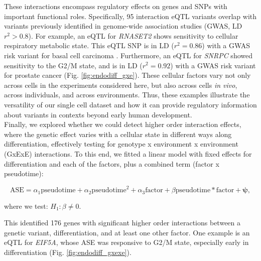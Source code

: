 These interactions encompass regulatory effects on genes and SNPs with important functional roles. Specifically, 95 interaction eQTL variants overlap with variants previously identified in genome-wide association studies (GWAS, LD $r^2>0.8$). 
For example, an eQTL for \textit{RNASET2} shows sensitivity to cellular respiratory metabolic state. 
This eQTL SNP is in LD ($r^2=0.86$) with a GWAS risk variant for basal cell carcinoma \cite{chahal2016genome}. Furthermore, an eQTL for \textit{SNRPC} showed sensitivity to the G2/M state, and is in LD ($r^2=0.92$) with a GWAS risk variant for prostate cancer \cite{schumacher2018association} (Fig. \ref{fig:endodiff_gxe}). 
These cellular factors vary not only across cells in the experiments considered here, but also across cells \textit{in vivo}, across individuals, and across environments. 
Thus, these examples illustrate the versatility of our single cell dataset and how it can provide regulatory information about variants in contexts beyond early human development.\\

Finally, we explored whether we could detect higher order interaction effects, where the genetic effect varies with a cellular state in different ways along differentiation, effectively testing for genotype x environment x environment (GxExE) interactions. 
To this end, we fitted a linear model with fixed effects for differentiation and each of the factors, plus a combined term (factor x pseudotime):

\begin{equation}
    \mathrm{ASE} = \alpha_1 \mathrm{pseudotime} + \alpha_2 \mathrm{pseudotime}^2 + \alpha_3\mathrm{factor} + \beta \mathrm{pseudotime}*\mathrm{factor} + \boldsymbol{\psi},
\end{equation}

where we test: $H_1: \beta \neq 0$.

This identified 176 genes with significant higher order interactions between a genetic variant, differentiation, and at least one other factor. 
One example is an eQTL for \textit{EIF5A}, whose ASE was responsive to G2/M state, especially early in differentiation (Fig. \ref{fig:endodiff_gxexe}). 


